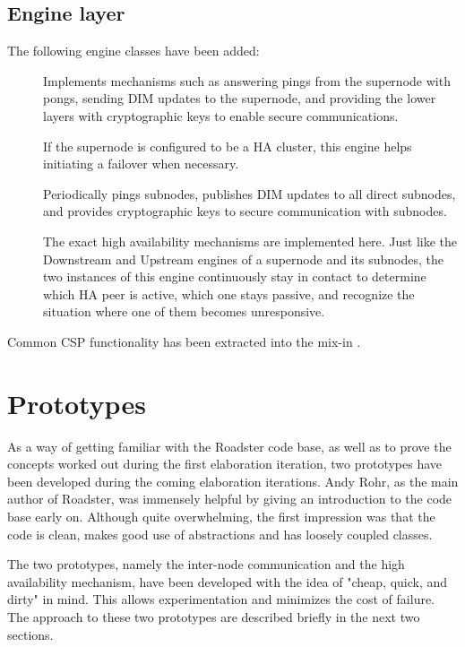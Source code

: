 \subsection{Engine layer}
The following engine classes have been added:
\begin{description}
	\item []
		Implements mechanisms such as answering pings from the
		supernode with pongs, sending DIM updates to the supernode, and
		providing the lower layers with cryptographic keys to enable
		secure communications.

		If the supernode is configured to be a \gls{HA} cluster,
		this engine helps initiating a failover when necessary.

	\item []
		Periodically pings subnodes, publishes DIM updates to all
		direct subnodes, and provides cryptographic keys to secure
		communication with subnodes.


	\item []
		The exact high availability mechanisms are implemented here.
		Just like the Downstream and Upstream engines of a supernode
		and its subnodes, the two instances of this engine continuously
		stay in contact to determine which HA peer is active, which one
		stays passive, and recognize the situation where one of them
		becomes unresponsive.
\end{description}

Common CSP functionality has been extracted into the mix-in .


\section{Prototypes}\label{sec:approach:prototypes}
As a way of getting familiar with the Roadster code base, as well as to prove
the concepts worked out during the first elaboration iteration, two prototypes have
been developed during the coming elaboration iterations. Andy Rohr, as the
main author of Roadster, was immensely helpful by giving an introduction to
the code base early on.  Although quite overwhelming, the first impression was
that the code is clean, makes good use of abstractions and has loosely coupled
classes.

The two prototypes, namely the inter-node communication and the high availability
mechanism, have been developed with the idea of "cheap, quick, and dirty" in mind. This
allows experimentation and minimizes the cost of failure.
The approach to these two prototypes are described briefly in the next two sections.


